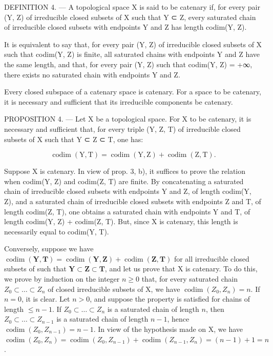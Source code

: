 DEFINITION 4. --- A topological space X is said to be catenary if, for every pair (Y, Z) of irreducible closed subsets of X such that Y ⊂ Z, every saturated chain of irreducible closed subsets with endpoints Y and Z has length codim(Y, Z).

It is equivalent to say that, for every pair (Y, Z) of irreducible closed subsets of X such that codim(Y, Z) is finite, all saturated chains with endpoints Y and Z have the same length, and that, for every pair (Y, Z) such that codim(Y, Z) = +∞, there exists no saturated chain with endpoints Y and Z.

Every closed subspace of a catenary space is catenary. For a space to be catenary, it is necessary and sufficient that its irreducible components be catenary.

PROPOSITION 4. --- Let X be a topological space. For X to be catenary, it is necessary and sufficient that, for every triple (Y, Z, T) of irreducible closed subsets of X such that Y ⊂ Z ⊂ T, one has:

\[
\operatorname{codim} (\mathrm{Y}, \mathrm{T}) = \operatorname{codim} (\mathrm{Y}, \mathrm{Z}) + \operatorname{codim} (\mathrm{Z}, \mathrm{T}).
\]

Suppose X is catenary. In view of prop. 3, b), it suffices to prove the relation when codim(Y, Z) and codim(Z, T) are finite. By concatenating a saturated chain of irreducible closed subsets with endpoints Y and Z, of length codim(Y, Z), and a saturated chain of irreducible closed subsets with endpoints Z and T, of length codim(Z, T), one obtains a saturated chain with endpoints Y and T, of length codim(Y, Z) + codim(Z, T). But, since X is catenary, this length is necessarily equal to codim(Y, T).

Conversely, suppose we have \(\operatorname{codim}(\mathbf{Y},\mathbf{T})=\operatorname{codim}(\mathbf{Y},\mathbf{Z})+\operatorname{codim}(\mathbf{Z},\mathbf{T})\) for all irreducible closed subsets  of  such that \(\mathbf{Y}\subset\mathbf{Z}\subset\mathbf{T}\), and let us prove that X is catenary. To do this, we prove by induction on the integer \(n\geqslant0\) that, for every saturated chain \(Z_{0}\subset\ldots\subset Z_{n}\) of closed irreducible subsets of X, we have \(\operatorname{codim}(Z_{0},Z_{n})=n\). If \(n=0\), it is clear. Let \(n>0\), and suppose the property is satisfied for chains of length \(\leqslant n-1\). If \(Z_{0}\subset\ldots\subset Z_{n}\) is a saturated chain of length \(n\), then \(Z_{0}\subset\ldots\subset Z_{n-1}\) is a saturated chain of length \(n-1\), hence \(\operatorname{codim}(Z_{0},Z_{n-1})=n-1\). In view of the hypothesis made on X, we have \(\operatorname{codim}(Z_{0},Z_{n})=\operatorname{codim}(Z_{0},Z_{n-1})+\operatorname{codim}(Z_{n-1},Z_{n})=(n-1)+1=n\).

